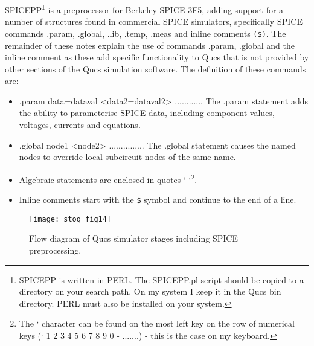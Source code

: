 SPICEPP\footnote{SPICEPP is written in PERL. The SPICEPP.pl script should be copied to a directory on your search path. On my system I keep it in the Qucs bin directory. PERL must also be installed on your system.} is a preprocessor for Berkeley SPICE 3F5, adding support for a number of structures found in commercial SPICE simulators, specifically SPICE commands .param, .global, .lib, .temp, .meas and inline comments \verb|($)|. The remainder of these notes explain the use of commands .param, .global and the inline comment as these add specific functionality to Qucs that is not provided by other sections of the Qucs simulation software. The definition of these commands are:
\begin{itemize}
\item .param data=dataval <data2=dataval2> ............ 
The .param statement adds the ability to parameterise SPICE data, including component values, voltages, currents and equations.
\item .global node1 <node2> ...............
The .global statement causes the named nodes to override local subcircuit nodes of the same name.
\item Algebraic statements are enclosed in quotes `        `\footnote{The ` character can be found on the most left key on the row of numerical keys (` 1 2 3 4 5 6 7 8 9 0 - .......) - this is the case on my keyboard.}.
\item Inline comments start with the \verb|$| symbol and continue to the end of a line.
\end{itemize}

  


 

\begin{figure}
  \centering
  \texttt{[image: stoq\_fig14]}
  \caption{Flow diagram of Qucs simulator stages including SPICE preprocessing.}
  \label{fig:stoq_fig14}
\end{figure} 

